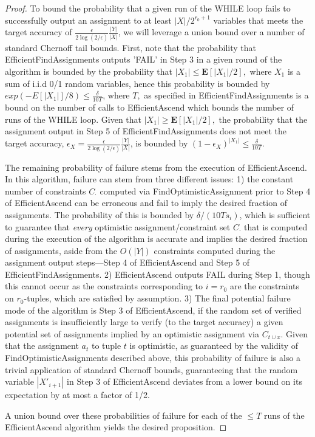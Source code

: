\documentclass[anon,12pt]{colt2018}
\newcommand{\eps}{\epsilon}
\newcommand{\E}{\textbf{E}}
\begin{document}
\begin{proof}
To bound the probability that a given run of the WHILE loop fails to successfully output an assignment to at least $|X|/2^{r_0+1}$ variables that meets the target accuracy of $\frac{\eps}{2 \log(2/\eps)}\frac{|Y|}{|X|}$, we will leverage a union bound over a number of standard Chernoff tail bounds.   First, note that the probability that EfficientFindAssignments outputs 'FAIL' in Step 3 in a given round of the algorithm is bounded by the probability that $|X_1| \le \E[|X_1|/2],$ where $X_1$ is a sum of i.i.d 0/1 random variables, hence this probability is bounded by $exp(-E[|X_1|]/8) \le \frac{\delta}{10 T}$, where $T,$ as specified in EfficientFindAssignments is a bound on the number of calls to EfficientAscend which bounds the number of runs of the WHILE loop.  Given that $|X_1| \ge \E[|X_1|/2],$ the probability that the assignment output in Step 5 of EfficientFindAssignments does not meet the target accuracy, $\eps_X=\frac{\eps}{2 \log(2/\eps)}\frac{|Y|}{|X|}$, is bounded by $(1-\eps_X)^{|X_1|} \le \frac{\delta}{10 T}.$  

The remaining  probability of failure stems from the execution of EfficientAscend.  In this algorithm, failure can stem from three different issues:  1) the constant number of constraints $C_{\cdot}$ computed via FindOptimisticAssignment prior to Step 4 of EfficientAscend can be erroneous and fail to imply the desired fraction of assignments.  The probability of this is bounded by $\delta/(10T s_i)$, which is sufficient to guarantee that \emph{every} optimistic assignment/constraint set $C_{\cdot}$ that is computed during the execution of the algorithm is accurate and implies the desired fraction of assignments, aside from the $O(|Y|)$ constraints computed during the assignment output steps---Step 4 of EfficientAscend and Step 5 of EfficientFindAssignments.   2) EfficientAscend outputs FAIL during Step 1, though this cannot occur as the constraints corresponding to  $i=r_0$ are the constraints on $r_0$-tuples, which are satisfied by assumption.   3) The final potential failure mode of the algorithm is Step 3 of EfficientAscend, if the random set of verified assignments is insufficiently large to verify (to the target accuracy) a given potential set of assignments implied by an optimistic assignment via $C_{t \cup x}$.  Given that the assignment $a_t$ to tuple $t$ is optimistic, as guaranteed by the validity of FindOptimisticAssignments described above, this probability of failure is also a trivial application of standard Chernoff bounds, guaranteeing that the random variable $|X'_{i+1}|$ in Step 3 of EfficientAscend deviates from a lower bound on its expectation by at most a factor of 1/2.

A union bound over these probabilities of failure for each of the $\le T$ runs of the EfficientAscend algorithm yields the desired proposition.
\end{proof}
\end{document}
